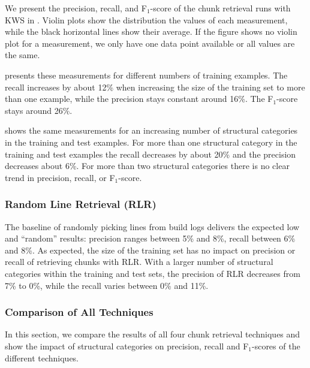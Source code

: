 We present the precision,
recall, and F$_{1}$-score of the chunk retrieval runs with KWS in
.
Violin plots show the distribution the values of each measurement,
while the black horizontal lines show their average.
If the figure shows no violin plot for a measurement, we only have one
data point available or all values are the same.

 presents these
measurements for different
numbers of training examples.
The recall increases by about 12\% when
increasing the size of the training set to more than one example,
while the precision stays constant around 16\%.
The F$_{1}$-score
stays around 26\%.

 shows the same
measurements for an increasing number of structural categories in the
training and test examples.
For more than one structural category in
the training and test examples the recall decreases by about 20\% and
the precision decreases about 6\%.
For more than two structural
categories there is no clear trend in precision, recall, or
F$_{1}$-score.

\subsubsection{Random Line Retrieval (RLR)}
\label{sec:r:rlr}
The baseline of randomly
picking lines from build logs delivers the expected low and
``random'' results: precision ranges between 5\% and 8\%,
recall between 6\% and 8\%.
As expected, the size of the training set has no impact on precision
or recall of retrieving chunks with RLR.
With a larger number of structural categories within the training and
test sets, the precision of RLR decreases from 7\% to 0\%, while
the recall varies between 0\% and 11\%.

\subsubsection{Comparison of All Techniques}
In this section, we compare the results of all four chunk retrieval
techniques and show the impact of structural categories on precision,
recall and F$_{1}$-scores of the different techniques.

